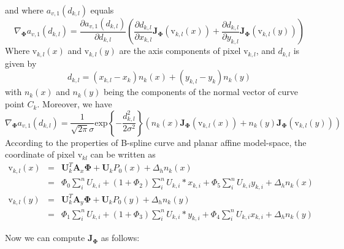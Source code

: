 and where $a_{v,1}(d_{k,l})$ equals
\begin{equation}
  \label{eq:nablaa}
\nabla_{\mathbf{\Phi}} a_{v,1}(d_{k,l}) = \frac{\partial a_{v,1}(d_{k,l})}{\partial d_{k,l}}
\left( \frac{\partial d_{k,l}}{\partial x_{k,l}}\mathbf{J}_{\mathbf{\Phi}}(\mathrm{v}_{k,l}(x)) + \frac{\partial d_{k,l}}{\partial y_{k,l}}\mathbf{J}_{\mathbf{\Phi}}(\mathrm{v}_{k,l}(y))
 \right)  
\end{equation}
Where $\mathrm{v}_{k,l}(x)$ and $\mathrm{v}_{k,l}(y)$ are the axis
components of pixel $\mathrm{v}_{k,l}$, and $d_{k,l}$ is given by
\begin{equation}
  \label{eq:diskl}
  d_{k,l} = (x_{k,l} - x_{k})n_{k}(x) +(y_{k,l} - y_{k}) n_{k}(y)
\end{equation}
with $n_{k}(x)$ and $n_{k}(y)$ being the components of the normal vector of
curve point $C_{k}$. Moreover, we have
\begin{equation}
  \label{eq:nabladkl}
  \nabla_{\mathbf{\Phi}} a_{v,1}(d_{k,l}) = \frac{1}{\sqrt{2\pi}\sigma} \mathrm{exp}\left\{ -\frac{d_{k,l}^2}{2\sigma^2} \right\}
\left( n_k(x)\mathbf{J}_{\mathbf{\Phi}}(\mathrm{v}_{k,l}(x)) + n_k(y)\mathbf{J}_{\mathbf{\Phi}}(\mathrm{v}_{k,l}(y))
 \right) 
\end{equation}
According to the properties of  B-spline curve  and planar affine
model-space, the coordinate of pixel $\mathrm{v}_{kl}$ can be written
as
\begin{eqnarray}
  \label{eq:vkl}
\mathrm{v}_{k,l}(x) &= & \mathbf{U}_k^{T}\mathbf{A}_x \mathbf{\Phi} + \mathbf{U}_k P_0(x) + \Delta_h n_k(x) \\
          &=&\Phi_0\sum_{i}^nU_{k,i} +
          (1+\Phi_2)\sum_{i}^nU_{k,i}*x_{k,i} + \Phi_{5}\sum_{i}^n
          U_{k,i}y_{k,i} + \Delta_h n_k(x)\\
\mathrm{v}_{k,l}(y) &=& \mathbf{U}_k^{T}\mathbf{A}_y \mathbf{\Phi} +
\mathbf{U}_k P_0(y) + \Delta_h n_k(y) \\
          &=&\Phi_1\sum_{i}^nU_{k,i} +
          (1+\Phi_3)\sum_{i}^nU_{k,i}*y_{k,i} + \Phi_{4}\sum_{i}^n
          U_{k,i}x_{k,i} + \Delta_h n_k(y)
\end{eqnarray}

Now we can compute $\mathbf{J}_{\mathbf{\Phi}}$ as follows:

